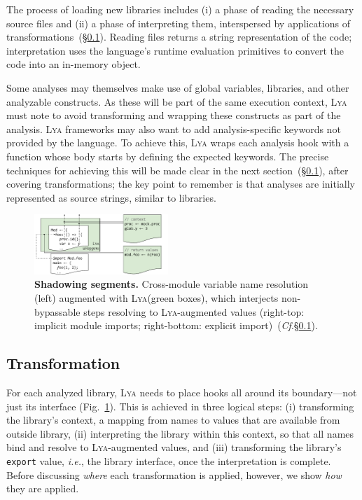 \documentclass[letterpaper,twocolumn,10pt]{article}
\def\ie{{\em i.e.}, }
\newcommand{\ttt}[1]{\texttt{#1}}
\newcommand{\cf}[1]{(\emph{Cf}.\S\ref{#1})}
\newcommand{\sx}[1]{(\S\ref{#1})}
\newcommand{\sys}{{\scshape Lya}\xspace}
\newcommand{\pc}{PIC\xspace}
\begin{document}
The process of loading new libraries includes (i) a phase of reading the necessary source files and (ii) a phase of interpreting them, interspersed by applications of transformations~\sx{two}.
Reading files returns a string representation of the code; interpretation uses the language's runtime evaluation primitives to convert the code into an in-memory object.

Some analyses may themselves make use of global variables, libraries, and other analyzable constructs.
As these will be part of the same execution context, \sys must note to avoid transforming and wrapping these constructs as part of the analysis.
\sys frameworks may also want to add analysis-specific keywords not provided by the language.
To achieve this, \sys wraps each analysis hook with a function whose body starts by defining the expected keywords.
The precise techniques for achieving this will be made clear in the next section~\sx{two}, after covering transformations;
  the key point to remember is that analyses are initially represented as source strings, similar to libraries.

\begin{figure}[t]
\centering 
\includegraphics[width=0.45\textwidth]{./figs/lya_shadowing.pdf}
\caption{
  \textbf{Shadowing segments.}
  \textmd{
  Cross-module variable name resolution (left) augmented with \sys (green boxes), which interjects non-bypassable steps resolving to \sys-augmented values (right-top: implicit module imports; right-bottom: explicit import)~\cf{two}.
  }
  \vspace{-4mm}
}
\label{fig:shadowing}
\end{figure}


\subsection{Transformation}
\label{two}

For each analyzed library, \sys needs to place hooks all around its boundary---not just its interface (Fig.~\ref{fig:shadowing}).
This is achieved in three logical steps:
(i) transforming the library's context, a mapping from names to values that are available from outside library,
(ii) interpreting the library within this context, so that all names bind and resolve to \sys-augmented values, and
(iii) transforming the library's \ttt{export} value, \ie the library interface, once the interpretation is complete.
Before discussing \emph{where} each transformation is applied, however, we show \emph{how} they are applied.
\end{document}
